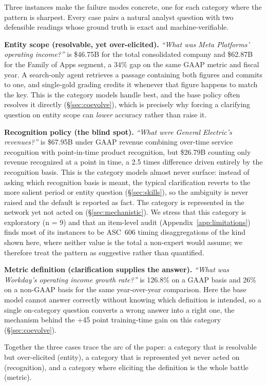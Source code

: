 Three instances make the failure modes concrete, one for each category where the pattern
is sharpest. Every case pairs a natural analyst question with two defensible readings
whose ground truth is exact and machine-verifiable.

\textbf{Entity scope (resolvable, yet over-elicited).} \emph{``What was Meta
Platforms' operating income?''} is \$46.75B for the total consolidated company and
\$62.87B for the Family of Apps segment, a 34\% gap on the same GAAP metric and
fiscal year. A search-only agent retrieves a passage containing both figures and
commits to one, and single-gold grading credits it whenever that figure happens to
match the key. This is the category models handle best, and the base policy often
resolves it directly (\S\ref{sec:coevolve}), which is precisely why forcing a
clarifying question on entity scope can \emph{lower} accuracy rather than raise it.

\textbf{Recognition policy (the blind spot).} \emph{``What were General Electric's
revenues?''} is \$67.95B under GAAP revenue combining over-time service recognition with
point-in-time product recognition, but \$26.79B counting only revenue recognized at a
point in time, a 2.5 times difference driven entirely by the recognition basis. This is
the category models almost never surface: instead of asking which recognition basis is
meant, the typical clarification reverts to the more salient period or entity question
(\S\ref{sec:skills}), so the ambiguity is never raised and the default is reported as
fact. The category is represented in the network yet not acted on
(\S\ref{sec:mechanistic}). We stress that this category is exploratory (n = 9) and that
an item-level audit (Appendix~\ref{app:limitations}) finds most of its instances to be
ASC~606 timing disaggregations of the kind shown here, where neither value is the total a
non-expert would assume; we therefore treat the pattern as suggestive rather than
quantified.

\textbf{Metric definition (clarification supplies the answer).} \emph{``What was
Workday's operating income growth rate?''} is 126.8\% on a GAAP basis and 26\% on
a non-GAAP basis for the same year-over-year comparison. Here the base model cannot
answer correctly without knowing which definition is intended, so a single on-category
question converts a wrong answer into a right one, the mechanism behind the +45
point training-time gain on this category (\S\ref{sec:coevolve}).

Together the three cases trace the arc of the paper: a category that is resolvable but
over-elicited (entity), a category that is represented yet never acted on (recognition),
and a category where eliciting the definition is the whole battle (metric).

